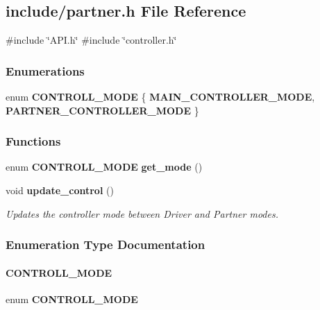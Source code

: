 \subsection{include/partner.h File Reference}
\label{a00053}
{\ttfamily \#include \char`\"{}A\+P\+I.\+h\char`\"{}}\newline
{\ttfamily \#include \char`\"{}controller.\+h\char`\"{}}\newline
\subsubsection*{Enumerations}
\begin{DoxyCompactItemize}
\item 
enum \textbf{ C\+O\+N\+T\+R\+O\+L\+L\+\_\+\+M\+O\+DE} \{ \textbf{ M\+A\+I\+N\+\_\+\+C\+O\+N\+T\+R\+O\+L\+L\+E\+R\+\_\+\+M\+O\+DE}, 
\textbf{ P\+A\+R\+T\+N\+E\+R\+\_\+\+C\+O\+N\+T\+R\+O\+L\+L\+E\+R\+\_\+\+M\+O\+DE}
 \}
\end{DoxyCompactItemize}
\subsubsection*{Functions}
\begin{DoxyCompactItemize}
\item 
enum \textbf{ C\+O\+N\+T\+R\+O\+L\+L\+\_\+\+M\+O\+DE} \textbf{ get\+\_\+mode} ()
\item 
void \textbf{ update\+\_\+control} ()
\begin{DoxyCompactList}\small\item\em Updates the controller mode between Driver and Partner modes. \end{DoxyCompactList}\end{DoxyCompactItemize}


\subsubsection{Enumeration Type Documentation}
\mbox{\label{a00053_afb2b5bca5ceab5f6efd8bac14a568324}} 
\paragraph{C\+O\+N\+T\+R\+O\+L\+L\+\_\+\+M\+O\+DE}
{\footnotesize\ttfamily enum \textbf{ C\+O\+N\+T\+R\+O\+L\+L\+\_\+\+M\+O\+DE}}

